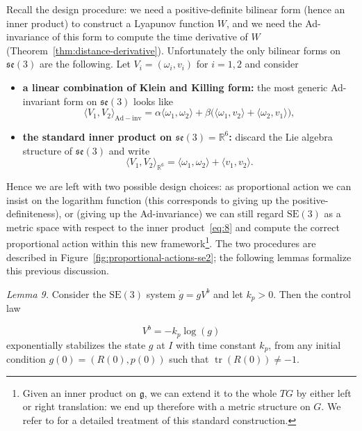 \documentclass[10pt,twocolumn]{article}
\newcommand{\SE}{\mathrm{SE}}
\newcommand{\se}{\mathfrak{se}}
\newcommand{\gfrak}{\mathfrak g}
\newcommand{\tr}{\operatorname{tr}}
\newcommand{\R}{\mathbb R}
\newcounter{paperitem}
\newcommand{\paperhead}[3]{\refstepcounter{paperitem}\par\medskip\noindent\textit{#1}\label{#3} #2\par}
\begin{document}
Recall the design procedure: we need a positive-definite bilinear form (hence an inner product) to construct a Lyapunov function $W$, and we need the Ad-invariance of this form to compute the time derivative of $W$ (Theorem~\ref{thm:distance-derivative}). Unfortunately the only bilinear forms on $\se(3)$ are the following. Let $V_i=(\omega_i,v_i)$ for $i=1,2$ and consider
\begin{itemize}[leftmargin=1.4em,label=$\square$,itemsep=0.25em,topsep=0.25em]
\item \textbf{a linear combination of Klein and Killing form:} the most generic Ad-invariant form on $\se(3)$ looks like
\begin{equation*}
\langle V_1,V_2\rangle_{\mathrm{Ad-inv}}
=\alpha\langle\omega_1,\omega_2\rangle
+\beta\bigl(\langle\omega_1,v_2\rangle+\langle\omega_2,v_1\rangle\bigr),
\end{equation*}
\item \textbf{the standard inner product on $\se(3)=\R^6$:} discard the Lie algebra structure of $\se(3)$ and write
\begin{equation*}
\langle V_1,V_2\rangle_{\R^6}
=\langle\omega_1,\omega_2\rangle+\langle v_1,v_2\rangle.\tag{8}\label{eq:8}
\end{equation*}
\end{itemize}
Hence we are left with two possible design choices: as proportional action we can insist on the logarithm function (this corresponds to giving up the positive-definiteness), or (giving up the Ad-invariance) we can still regard $\SE(3)$ as a metric space with respect to the inner product~\eqref{eq:8} and compute the correct proportional action within this new framework\footnote{Given an inner product on $\gfrak$, we can extend it to the whole $TG$ by either left or right translation: we end up therefore with a metric structure on $G$. We refer to \cite{9} for a detailed treatment of this standard construction.}. The two procedures are described in Figure~\ref{fig:proportional-actions-se2}; the following lemmas formalize this previous discussion.

\paperhead{Lemma 9.}{Consider the $\SE(3)$ system $\dot g=gV^b$ and let $k_p>0$. Then the control law}{lem:log-feedback-se3}
\begin{equation*}
V^b=-k_p\log(g)\tag{9}\label{eq:9}
\end{equation*}
exponentially stabilizes the state $g$ at $I$ with time constant $k_p$, from any initial condition $g(0)=(R(0),p(0))$ such that $\tr(R(0))\neq-1$.
\end{document}
